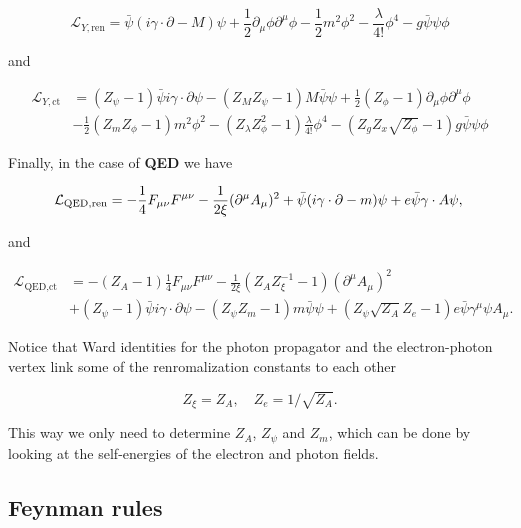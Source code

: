 \documentclass[../FeynCalcManual.tex]{subfiles}
\begin{document}
\begin{equation}
\mathcal{L}_{Y,{\textrm{ren}}} = \bar{\psi} (i \gamma \cdot \partial - M) \psi + \frac{1}{2} \partial_\mu \phi \partial^\mu \phi - \frac{1}{2} m^2 \phi^2 - \frac{\lambda}{4!} \phi^4 - g \bar{\psi} \psi \phi
\end{equation}

and

\begin{align*}
\mathcal{L}_{Y,{\textrm{ct}}} &= (Z_\psi - 1) \bar{\psi} i \gamma \cdot \partial \psi - (Z_M Z_\psi - 1) M \bar{\psi} \psi + \frac{1}{2} (Z_\phi - 1) \partial_\mu \phi \partial^\mu \phi \\
&- \frac{1}{2} (Z_m Z_\phi -1) m^2 \phi^2 -  (Z_\lambda Z_\phi^2 -1) \frac{\lambda}{4!} \phi^4 - (Z_g Z_x \sqrt{Z_\phi} -1) g \bar{\psi} \psi \phi
\end{align*}

Finally, in the case of \textbf{QED} we have

\begin{equation}
  \mathcal{L}_{\textrm{QED},\textrm{ren}} = -\frac{1}{4} F_{\mu \nu}F^{\mu \nu} - \frac{1}{2 \xi}(\partial^\mu A_\mu)^2 +
  \bar{\psi} (i \gamma \cdot \partial -m) \psi + e  \bar{\psi} \gamma \cdot A \psi ,\\
\end{equation}

and

\begin{align*}
  \mathcal{L}_{\textrm{QED},\textrm{ct}}  & = - (Z_A-1) \frac{1}{4}F_{\mu \nu}F^{\mu \nu} - \frac{1}{2\xi} (Z_A Z^{-1}_\xi - 1) (\partial^\mu A_\mu)^2 \nonumber \\
    & + (Z_\psi-1) \bar{\psi} i \gamma \cdot \partial \psi- (Z_\psi Z_m -1) m \bar{\psi} \psi + (Z_\psi \sqrt{Z_A} Z_e -1) e \bar{\psi} \gamma^\mu \psi A_\mu.
\end{align*}

Notice that Ward identities for the photon propagator and the
electron-photon vertex link some of the renromalization constants to
each other

\begin{equation}
Z_\xi = Z_A, \quad Z_e = 1/\sqrt{Z_A}.
\end{equation}

This way we only need to determine \(Z_A\), \(Z_\psi\) and \(Z_m\),
which can be done by looking at the self-energies of the electron and
photon fields.

\hypertarget{feynman-rules}{%
\subsection{Feynman rules}\label{feynman-rules}}
\end{document}
